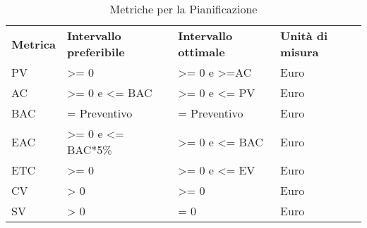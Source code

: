 \renewcommand{\arraystretch}{2.2}
\begin{longtable}{|C{2cm}|C{3.5cm}|C{3.5cm}|C{3cm}|}

	\caption{Metriche per la Pianificazione }\\
	\hline

	\textbf{Metrica} & \textbf{Intervallo preferibile}  & \textbf{Intervallo ottimale} & \textbf{Unità di misura}
	\tabularnewline
	\endfirsthead

	PV & >= 0 & >= 0 e >=AC & Euro \\
	AC & >= 0 e <= BAC & >= 0 e <= PV & Euro \\
	BAC & = Preventivo  & = Preventivo & Euro \\
	EAC & >= 0 e <= BAC*5\%& >= 0 e <= BAC & Euro \\
	ETC & >= 0 & >= 0 e <= EV & Euro \\
	CV & > 0 & >= 0 & Euro \\
	SV & > 0 & = 0 & Euro \\
\end{longtable}
